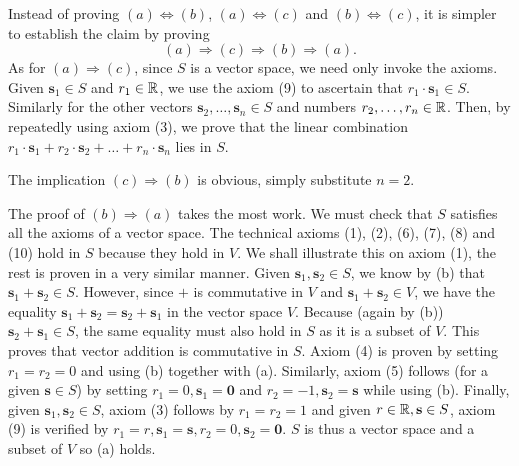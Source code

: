 \begin{lemproof}
 Instead of proving $(a) \Leftrightarrow (b)$, $(a) \Leftrightarrow (c)$ and
 $(b) \Leftrightarrow (c)$, it is simpler to establish the claim by proving
 \[
  (a) \Rightarrow (c) \Rightarrow (b) \Rightarrow (a).
 \]
 As for $(a) \Rightarrow (c)$, since $S$ is a vector space, we need only invoke
 the axioms. Given $\mathbf{s}_1 \in S$ and $r_1 \in \mathbb{R}$, we use the axiom (9)
 to ascertain that $r_1 \cdot \mathbf{s}_1 \in S$. Similarly for the other
 vectors $\mathbf{s}_2,\ldots,\mathbf{s}_n \in S$ and numbers $r_2,\ldots,r_n
 \in \mathbb{R}$. Then, by repeatedly using axiom (3), we prove that the linear
 combination $r_1 \cdot \mathbf{s}_1 + r_2 \cdot \mathbf{s}_2 + \ldots + r_n
 \cdot \mathbf{s}_n$ lies in $S$.

 The implication $(c) \Rightarrow (b)$ is obvious, simply substitute $n = 2$.

 The proof of $(b) \Rightarrow (a)$ takes the most work. We must check that $S$
 satisfies all the axioms of a vector space. The technical axioms (1), (2), (6),
 (7), (8) and (10) hold in $S$ because they hold in $V$. We shall illustrate
 this on axiom (1), the rest is proven in a very similar manner. Given
 $\mathbf{s}_1,\mathbf{s}_2 \in S$, we know by (b) that $\mathbf{s}_1 +
 \mathbf{s}_2 \in S$. However, since $+$ is commutative in $V$ and $\mathbf{s}_1
 + \mathbf{s}_2 \in V$, we have the equality $\mathbf{s}_1 + \mathbf{s}_2 =
 \mathbf{s}_2 + \mathbf{s}_1$ in the vector space $V$. Because (again by (b))
 $\mathbf{s}_2 + \mathbf{s}_1 \in S$, the same equality must also hold in $S$ as
 it is a subset of $V$. This proves that vector addition is commutative in $S$.
 Axiom (4) is proven by setting $r_1 = r_2 = 0$ and using (b) together with
  (a). Similarly, axiom (5) follows (for a
 given $\mathbf{s} \in S$) by setting $r_1 = 0, \mathbf{s}_1 = \mathbf{0}$ and
 $r_2 = -1, \mathbf{s}_2 = \mathbf{s}$ while using
  (b). Finally, given
 $\mathbf{s}_1,\mathbf{s}_2 \in S$, axiom (3) follows by $r_1 = r_2 = 1$ and
 given $r \in \mathbb{R},\mathbf{s} \in S$, axiom (9) is verified by $r_1 = r,
 \mathbf{s}_1 = \mathbf{s}, r_2 = 0, \mathbf{s}_2 = \mathbf{0}$. $S$ is thus a
 vector space and a subset of $V$ so (a) holds.
\end{lemproof}

